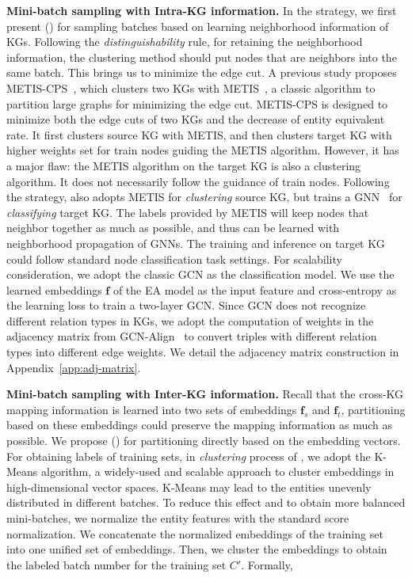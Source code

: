 \noindent
\textbf{Mini-batch sampling with Intra-KG information.} In the \Sampling{} strategy, we first present  \MetisFullName{} (\MetisGCN{}) for sampling batches based on learning neighborhood information of KGs. Following the  \emph{distinguishability} rule, for retaining the neighborhood information, the clustering method should put nodes that are neighbors into the same batch. This brings us to minimize the edge cut. A previous study proposes METIS-CPS~\cite{LargeEA22}, which clusters two KGs with METIS~\cite{METIS98}, a classic algorithm to partition large graphs for minimizing the edge cut. METIS-CPS is designed to minimize both the edge cuts of two KGs and the decrease of entity equivalent rate. It first clusters source KG with METIS, and then clusters target KG with higher weights set for train nodes guiding the METIS algorithm. However, it has a major flaw: the METIS algorithm on the target KG is also a clustering algorithm. It does not necessarily follow the guidance of train nodes. Following the \Sampling{} strategy, \MetisGCN{} also adopts METIS for \emph{clustering} source KG, but trains a GNN~\cite{GCN17} for \emph{classifying} target KG. The labels provided by METIS will keep nodes that neighbor together as much as possible, and thus can be learned with neighborhood propagation of GNNs. The training and inference on target KG could follow standard node classification task settings. For scalability consideration, we adopt the classic GCN as the classification model. We use the learned embeddings $\mathbf{f}$ of the EA model as the input feature and cross-entropy as the learning loss to train a two-layer GCN. Since GCN does not recognize different relation types in KGs, we adopt the computation of weights in the adjacency matrix from GCN-Align~\cite{GCN-Align18} to convert triples with different relation types into different edge weights. We detail the adjacency matrix construction in Appendix~\ref{app:adj-matrix}.

\noindent
\textbf{Mini-batch sampling with Inter-KG information.} Recall that the cross-KG mapping information is learned into two sets of embeddings $\mathbf{f}_s$ and $\mathbf{f}_t$, partitioning based on these embeddings could preserve the mapping information as much as possible. We propose \KMeansFullName{} (\KMeans{}) for partitioning directly based on the embedding vectors.
For obtaining labels of training sets, in \emph{clustering} process of \KMeans{}, we adopt the K-Means algorithm, a widely-used and scalable approach to cluster embeddings in high-dimensional vector spaces.
K-Means may lead to the entities unevenly distributed in different batches. To reduce this effect and to obtain more balanced mini-batches, we normalize the entity features with the standard score normalization. We concatenate the normalized embeddings of the training set into one unified set of embeddings. Then, we cluster the embeddings to obtain the labeled batch number for the training set $C'$. Formally,

